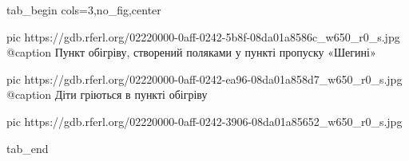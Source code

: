  
 
 
 
 


\ifcmt
  tab_begin cols=3,no_fig,center

     pic https://gdb.rferl.org/02220000-0aff-0242-5b8f-08da01a8586c_w650_r0_s.jpg
		 @caption Пункт обігріву, створений поляками у пункті пропуску «Шегині»

		 pic https://gdb.rferl.org/02220000-0aff-0242-ea96-08da01a858d7_w650_r0_s.jpg
		 @caption Діти гріються в пункті обігріву

		 pic https://gdb.rferl.org/02220000-0aff-0242-3906-08da01a85652_w650_r0_s.jpg

  tab_end
\fi
